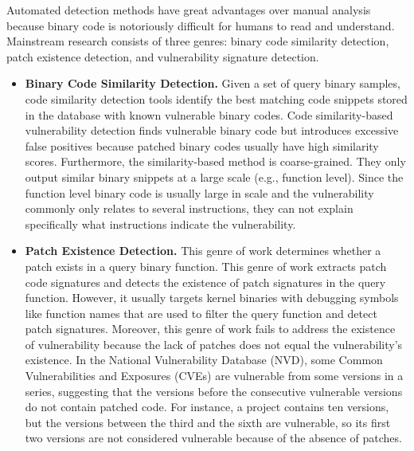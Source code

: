 Automated detection methods have great advantages over manual analysis because binary code is notoriously difficult for humans to read and understand.  
Mainstream research consists of three genres: binary code similarity detection, patch existence detection, and vulnerability signature detection. 
\begin{itemize}
 \item \textbf{Binary Code Similarity Detection.} 
 Given a set of query binary samples, code similarity detection tools \cite{spain, BINCLONE, SMIT, Kam1n0, MBC, IDEA, Expose, binsequence, tracy, exediff, genius, binslayer, cxz2014, rendezvous, BEAGLE, fossil, SIGMA, COP, gemini, VULSEEKER, qbindiff, safe, innereye, aDiff, asm2vec, multimh, binhash, ks2017, bingo, IMF-SIM, binhunt, esh, GITZ, binjuice, tedem, xmatch} identify the best matching code snippets stored in the database with known vulnerable binary codes. 
 Code similarity-based vulnerability detection finds vulnerable binary code but introduces excessive false positives because patched binary codes usually have high similarity scores. 
 Furthermore, the similarity-based method is coarse-grained. They only output similar binary snippets at a large scale (e.g., function level). Since the function level binary code is usually large in scale and the vulnerability commonly only relates to several instructions, they can not explain specifically what instructions indicate the vulnerability.

 \item\textbf{Patch Existence Detection.} This genre of work \cite{fiber, pdiff, spain, patchscope} determines whether a patch exists in a query binary function. 
 This genre of work extracts patch code signatures and detects the existence of patch signatures in the query function. 
 However, it usually targets kernel binaries with debugging symbols like function names that are used to filter the query function and detect patch signatures. 
 Moreover, this genre of work fails to address the existence of vulnerability because the lack of patches does not equal the vulnerability's existence. 
 In the National Vulnerability Database (NVD), some Common Vulnerabilities and Exposures (CVEs) are vulnerable from some versions in a series, suggesting that the versions before the consecutive vulnerable versions do not contain patched code. 
 For instance, a project contains ten versions, but the versions between the third and the sixth are vulnerable, so its first two versions are not considered vulnerable because of the absence of patches.  


\end{itemize}
